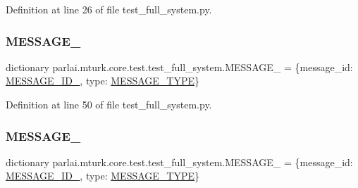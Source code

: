 Definition at line 26 of file test\+\_\+full\+\_\+system.\+py.

\mbox{\label{namespaceparlai_1_1mturk_1_1core_1_1test_1_1test__full__system_a2d21ea5ca6f406476013a4e629185213}} 
\subsubsection{\texorpdfstring{M\+E\+S\+S\+A\+G\+E\+\_}{MESSAGE\_1}}
{\footnotesize\ttfamily dictionary parlai.\+mturk.\+core.\+test.\+test\+\_\+full\+\_\+system.\+M\+E\+S\+S\+A\+G\+E\+\_ = \{\textquotesingle{}message\+\_\+id\textquotesingle{}\+: \hyperlink{namespaceparlai_1_1mturk_1_1core_1_1test_1_1test__full__system_af4c8bc21d78bcfe5a880215a87c1019b}{M\+E\+S\+S\+A\+G\+E\+\_\+\+I\+D\+\_}, \textquotesingle{}type\textquotesingle{}\+: \hyperlink{namespaceparlai_1_1mturk_1_1core_1_1test_1_1test__full__system_acf878fb471bb0af522f8f0a2020199c7}{M\+E\+S\+S\+A\+G\+E\+\_\+\+T\+Y\+PE}\}}



Definition at line 50 of file test\+\_\+full\+\_\+system.\+py.

\mbox{\label{namespaceparlai_1_1mturk_1_1core_1_1test_1_1test__full__system_a27f238464a502321834daa93a793293f}} 
\subsubsection{\texorpdfstring{M\+E\+S\+S\+A\+G\+E\+\_}{MESSAGE\_2}}
{\footnotesize\ttfamily dictionary parlai.\+mturk.\+core.\+test.\+test\+\_\+full\+\_\+system.\+M\+E\+S\+S\+A\+G\+E\+\_ = \{\textquotesingle{}message\+\_\+id\textquotesingle{}\+: \hyperlink{namespaceparlai_1_1mturk_1_1core_1_1test_1_1test__full__system_a1fff7d388cae6b92e11cd4944c0ee06a}{M\+E\+S\+S\+A\+G\+E\+\_\+\+I\+D\+\_}, \textquotesingle{}type\textquotesingle{}\+: \hyperlink{namespaceparlai_1_1mturk_1_1core_1_1test_1_1test__full__system_acf878fb471bb0af522f8f0a2020199c7}{M\+E\+S\+S\+A\+G\+E\+\_\+\+T\+Y\+PE}\}}



